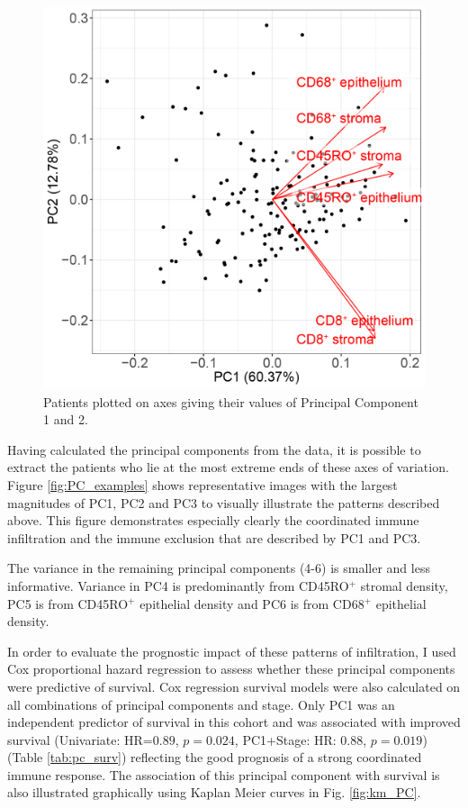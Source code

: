 \begin{figure}
    \centering
    \includegraphics{Chapter2/Figs/Raster/PCA_xy.png}
    \caption{Patients plotted on axes giving their values of Principal Component 1 and 2.}
    \label{fig:PC_plot}
\end{figure}
 
Having calculated the principal components from the data, it is possible to extract the patients who lie at the most extreme ends of these axes of variation. Figure \ref{fig:PC_examples} shows representative images with the largest magnitudes of PC1, PC2 and PC3 to visually illustrate the patterns described above. This figure demonstrates especially clearly the coordinated immune infiltration and the immune exclusion that are described by PC1 and PC3. 

The variance in the remaining principal components (4-6) is smaller and less informative. Variance in PC4 is predominantly from CD45RO$^+$ stromal density, PC5 is from CD45RO$^+$ epithelial density and PC6 is from CD68$^+$ epithelial density. 


In order to evaluate the prognostic impact of these patterns of infiltration, I used Cox proportional hazard regression to assess whether these principal components were predictive of survival. Cox regression survival models were also calculated on all combinations of principal components and stage. Only PC1 was an independent predictor of survival in this cohort and was associated with improved survival (Univariate: HR=$0.89$, $p=0.024$, PC1+Stage: HR: $0.88$, $p=0.019$) (Table \ref{tab:pc_surv}) reflecting the good prognosis of a strong coordinated immune response. The association of this principal component with survival is also illustrated graphically using Kaplan Meier curves in Fig. \ref{fig:km_PC}.

